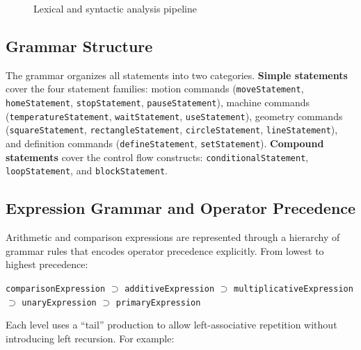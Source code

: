 \begin{figure}[H]
\centering
{}
\caption{Lexical and syntactic analysis pipeline}
\label{fig:parser-pipeline}
\end{figure}

\subsection*{Grammar Structure}

The grammar organizes all statements into two categories. \textbf{Simple statements} cover the four statement families: motion commands (\texttt{moveStatement}, \texttt{homeStatement}, \texttt{stopStatement}, \texttt{pauseStatement}), machine commands (\texttt{temperatureStatement}, \texttt{waitStatement}, \texttt{useStatement}), geometry commands (\texttt{squareStatement}, \texttt{rectangleStatement}, \texttt{circleStatement}, \texttt{lineStatement}), and definition commands (\texttt{defineStatement}, \texttt{setStatement}). \textbf{Compound statements} cover the control flow constructs: \texttt{conditionalStatement}, \texttt{loopStatement}, and \texttt{blockStatement}.

\subsection*{Expression Grammar and Operator Precedence}

Arithmetic and comparison expressions are represented through a hierarchy of grammar rules that encodes operator precedence explicitly. From lowest to highest precedence:

\begin{center}
\texttt{comparisonExpression} $\supset$ \texttt{additiveExpression} $\supset$ \texttt{multiplicativeExpression} $\supset$ \texttt{unaryExpression} $\supset$ \texttt{primaryExpression}
\end{center}

Each level uses a ``tail'' production to allow left-associative repetition without introducing left recursion. For example:

